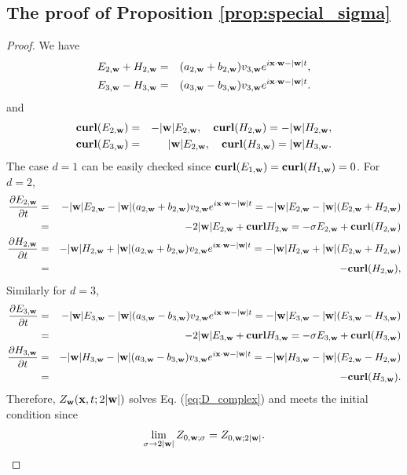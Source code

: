 \documentclass[10pt,reqno]{amsart}
\renewcommand{\(}{\left(}
\renewcommand{\)}{\right)}
\newcommand{\bw}{{\bf w}}
\newcommand{\CU}{{\bf curl}}
\newcommand{\bx}{\mathbf{x}}
\numberwithin{equation}{section}
\begin{document}
\subsection{The proof of Proposition \ref{prop:special_sigma}}\label{app-prop:special_sigma}
\begin{proof} We have
	\begin{eqnarray*}
		E_{2,\bw} + H_{2,\bw} &=& (a_{2,\bw} + b_{2,\bw})v_{3,\bw}e^{i\bx\cdot \bw-|\bw|t},\\
		E_{3,\bw} - H_{3,\bw} &=& (a_{3,\bw} - b_{3,\bw})v_{3,\bw}e^{i\bx\cdot \bw-|\bw|t}.
	\end{eqnarray*}
	and
	\begin{eqnarray*}
		\CU (E_{2,\bw}) &=& -|\bw| E_{2,\bw},  \quad \CU (H_{2,\bw}) = -|\bw| H_{2,\bw},\\
		\CU (E_{3,\bw}) &=& |\bw| E_{2,\bw},  \quad \CU (H_{3,\bw}) = |\bw| H_{3,\bw}.
	\end{eqnarray*}
The case $d=1$ can be easily checked since $\CU (E_{1,\bw})= \CU (H_{1,\bw})=0$. For $d=2$, 
	\begin{eqnarray*}
		\frac{\partial E_{2,\bw}}{\partial t}&=& -|\bw|  E_{2,\bw} -  |\bw|(a_{2,\bw} + b_{2,\bw})v_{2,\bw}e^{i\bx\cdot \bw-|\bw|t}=-|\bw|  E_{2,\bw}  -|\bw|(E_{2,\bw} + H_{2,\bw}) \nonumber\\ 
		&=& -2|\bw| E_{2,\bw} + \CU H_{2,\bw} = -\sigma E_{2,\bw} + \CU (H_{2,\bw}) \\
		\frac{\partial H_{2,\bw}}{\partial t}&=& -|\bw|  H_{2,\bw} +  |\bw|(a_{2,\bw} + b_{2,\bw})v_{2,\bw}e^{i\bx\cdot \bw-|\bw|t}=-|\bw|  H_{2,\bw}  +|\bw|(E_{2,\bw} + H_{2,\bw}) \nonumber\\ 
		&=&  -\CU (H_{2,\bw}),
	\end{eqnarray*}
	Similarly for $d=3$,
	\begin{eqnarray*}
		\frac{\partial E_{3,\bw}}{\partial t}&=& -|\bw|  E_{3,\bw} -  |\bw|(a_{3,\bw} - b_{3,\bw})v_{2,\bw}e^{i\bx\cdot \bw-|\bw|t}=-|\bw|  E_{3,\bw}  -|\bw|(E_{3,\bw} - H_{3,\bw}) \nonumber\\
		&=& -2|\bw| E_{3,\bw} + \CU H_{3,\bw} = -\sigma E_{3,\bw} + \CU (H_{3,\bw}) \\
		\frac{\partial H_{3,\bw}}{\partial t}&=& -|\bw|  H_{3,\bw} -  |\bw|(a_{3,\bw} - b_{3,\bw})v_{3,\bw}e^{i\bx\cdot \bw-|\bw|t}=-|\bw|  H_{3,\bw}  -|\bw|(E_{2,\bw} - H_{2,\bw}) \nonumber\\ 
		&=&  -\CU (H_{3,\bw}).
	\end{eqnarray*}
Therefore,  $Z_{\bw}(\bx,t; 2|\bw|)$ solves Eq. (\ref{eq:D_complex}) and meets the initial condition since 
\[
\lim_{\sigma\to 2|\bw|}Z_{0,\bw; \sigma}=Z_{0,\bw; 2|\bw|}.
\]
\end{proof}
\end{document}
